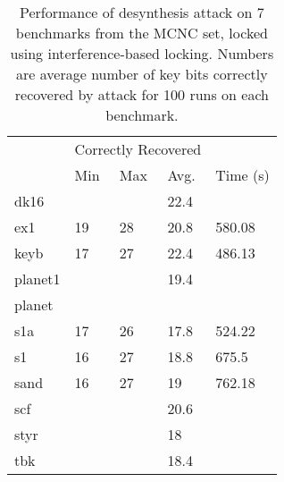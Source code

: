 \begin{table}[ht]
\centering
\caption{Performance of desynthesis attack on 7 benchmarks from the MCNC set, locked using interference-based locking. Numbers are average number of key bits correctly recovered by attack for 100 runs on each benchmark.}
\label{my-label}
\begin{tabular}{|l|l|l|l|l|}
\hline
                  & \multicolumn{3}{l|}{Correctly Recovered} &          %
                  \\ \cline{2-5} 
                  & Min         & Max         & Avg.         & Time (s) \\ \hline
dk16              &           &           &       22.4   &      \\ \hline
ex1              &  19         &  28         & 20.8     &  580.08      \\ \hline
keyb             &  17         &   27        & 22.4         &486.13\\ \hline
planet1             &           &           &   19.4       &   \\ \hline
planet             &           &           &          &\\ \hline
s1a             &   17        &  26         &  17.8        &524.22
\\ \hline
s1             &     16      &    27       &         18.8  &675.5
\\ \hline
sand             & 16          &  27         &  19       &762.18
\\ \hline
scf             &           &           &   20.6       &\\ \hline
styr             &           &           &   18       &\\ \hline
tbk             &           &           &   18.4       &\\ \hline

\end{tabular}
\end{table}

